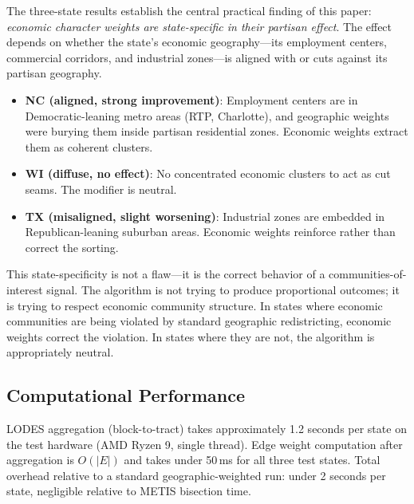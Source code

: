 The three-state results establish the central practical finding of this paper:
\emph{economic character weights are state-specific in their partisan effect}.
The effect depends on whether the state's economic geography---its employment
centers, commercial corridors, and industrial zones---is aligned with or
cuts against its partisan geography.

\begin{itemize}
  \item \textbf{NC (aligned, strong improvement)}: Employment centers are
    in Democratic-leaning metro areas (RTP, Charlotte), and geographic weights
    were burying them inside partisan residential zones. Economic weights
    extract them as coherent clusters.
  \item \textbf{WI (diffuse, no effect)}: No concentrated economic clusters
    to act as cut seams. The modifier is neutral.
  \item \textbf{TX (misaligned, slight worsening)}: Industrial zones are
    embedded in Republican-leaning suburban areas. Economic weights reinforce
    rather than correct the sorting.
\end{itemize}

This state-specificity is not a flaw---it is the correct behavior of a
communities-of-interest signal.
The algorithm is not trying to produce proportional outcomes; it is trying to
respect economic community structure.
In states where economic communities are being violated by standard
geographic redistricting, economic weights correct the violation.
In states where they are not, the algorithm is appropriately neutral.

\subsection{Computational Performance}

LODES aggregation (block-to-tract) takes approximately 1.2 seconds per state
on the test hardware (AMD Ryzen 9, single thread).
Edge weight computation after aggregation is $O(|E|)$ and takes under 50\,ms
for all three test states.
Total overhead relative to a standard geographic-weighted run: under 2 seconds
per state, negligible relative to METIS bisection time.
